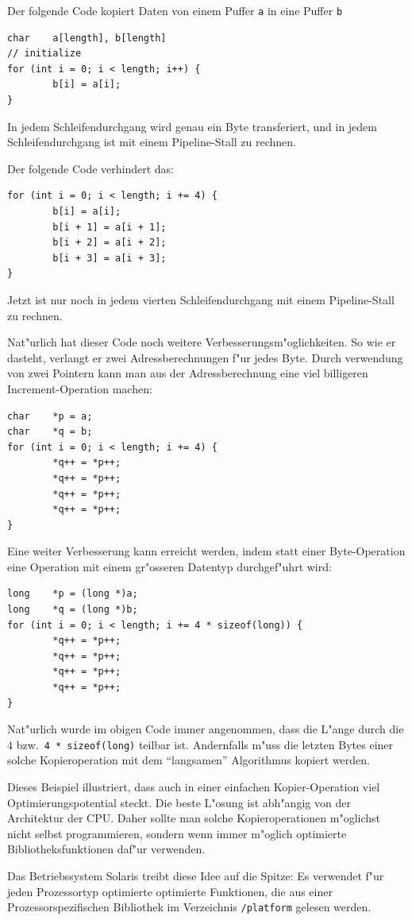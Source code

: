\begin{beispiel}
Der folgende Code kopiert Daten von einem Puffer {\tt a} in eine Puffer {\tt b}
\begin{verbatim}
char    a[length], b[length]
// initialize
for (int i = 0; i < length; i++) {
        b[i] = a[i];
}
\end{verbatim}
In jedem Schleifendurchgang wird genau ein Byte transferiert, und in jedem
Schleifendurchgang ist mit einem Pipeline-Stall zu rechnen. 

Der folgende Code verhindert das:
\begin{verbatim}
for (int i = 0; i < length; i += 4) {
        b[i] = a[i];
        b[i + 1] = a[i + 1];
        b[i + 2] = a[i + 2];
        b[i + 3] = a[i + 3];
}
\end{verbatim}
Jetzt ist nur noch in jedem vierten Schleifendurchgang mit einem Pipeline-Stall
zu rechnen.

Nat"urlich hat dieser Code noch weitere Verbesserungsm"oglichkeiten.
So wie er dasteht, verlangt er zwei Adressberechnungen f"ur jedes Byte.
Durch verwendung von zwei Pointern kann man aus der Adressberechnung
eine viel billigeren Increment-Operation machen:
\begin{verbatim}
char    *p = a;
char    *q = b;
for (int i = 0; i < length; i += 4) {
        *q++ = *p++;
        *q++ = *p++;
        *q++ = *p++;
        *q++ = *p++;
}
\end{verbatim}
Eine weiter Verbesserung kann erreicht werden, indem statt einer
Byte-Operation eine Operation mit einem gr"osseren Datentyp durchgef"uhrt wird:
\begin{verbatim}
long    *p = (long *)a;
long    *q = (long *)b;
for (int i = 0; i < length; i += 4 * sizeof(long)) {
        *q++ = *p++;
        *q++ = *p++;
        *q++ = *p++;
        *q++ = *p++;
}
\end{verbatim}
Nat"urlich wurde im obigen Code immer angenommen, dass die L"ange durch
die $4$ bzw.~\verb+4 * sizeof(long)+ teilbar ist.
Andernfalls m"uss die letzten Bytes einer solche Kopieroperation mit
dem ``langsamen'' Algorithmus kopiert werden.

Dieses Beispiel illustriert, dass auch in einer einfachen Kopier-Operation
viel Optimierungspotential steckt. Die beste L"osung  ist abh"angig von der
Architektur der CPU. Daher sollte man solche Kopieroperationen m"oglichst
nicht selbst programmieren, sondern wenn immer m"oglich optimierte
Bibliotheksfunktionen daf"ur verwenden.

Das Betriebssystem Solaris treibt diese Idee auf die Spitze:
Es verwendet f"ur jeden Prozessortyp optimierte
optimierte Funktionen, die aus einer Prozessorspezifischen Bibliothek
im Verzeichnis \verb+/platform+ gelesen werden.
\end{beispiel}


